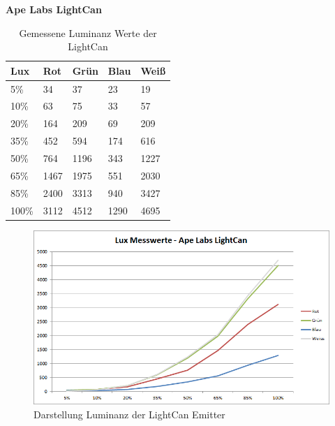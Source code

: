 \documentclass[11pt]{scrartcl}
\begin{document}
\textbf{Ape Labs LightCan}
\begin{table}[H]
    \begin{tabularx}{\textwidth}{|X|X|X|X|X|}
        \hline
        Lux   & Rot  & Grün  & Blau & Weiß\\\hline
        5\%   & 34   & 37    & 23   & 19  \\\hline
        10\%  & 63   & 75    & 33   & 57  \\\hline
        20\%  & 164  & 209   & 69   & 209 \\\hline
        35\%  & 452  & 594   & 174  & 616 \\\hline
        50\%  & 764  & 1196  & 343  & 1227\\\hline
        65\%  & 1467 & 1975  & 551  & 2030\\\hline
        85\%  & 2400 & 3313  & 940  & 3427\\\hline
        100\% & 3112 & 4512  & 1290 & 4695\\\hline
    \end{tabularx}
    \caption{Gemessene Luminanz Werte der LightCan} \label{table:luxLightCan}
\end{table}
\begin{figure}[H]
    \begin{center}
        \includegraphics[width=\textwidth]{images/charts/lightCan.png}
    \end{center}
    \caption{Darstellung Luminanz der LightCan Emitter} \label{fig:luxLightCan}
\end{figure}
\end{document}
